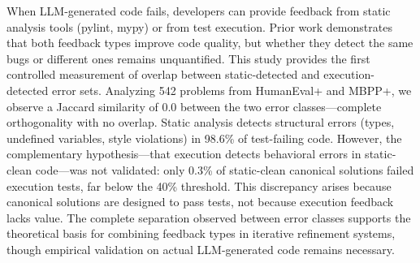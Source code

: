 
When LLM-generated code fails, developers can provide feedback from static analysis tools (pylint, mypy) or from test execution. Prior work demonstrates that both feedback types improve code quality, but whether they detect the same bugs or different ones remains unquantified. This study provides the first controlled measurement of overlap between static-detected and execution-detected error sets. Analyzing 542 problems from HumanEval+ and MBPP+, we observe a Jaccard similarity of 0.0 between the two error classes---complete orthogonality with no overlap. Static analysis detects structural errors (types, undefined variables, style violations) in 98.6\% of test-failing code. However, the complementary hypothesis---that execution detects behavioral errors in static-clean code---was not validated: only 0.3\% of static-clean canonical solutions failed execution tests, far below the 40\% threshold. This discrepancy arises because canonical solutions are designed to pass tests, not because execution feedback lacks value. The complete separation observed between error classes supports the theoretical basis for combining feedback types in iterative refinement systems, though empirical validation on actual LLM-generated code remains necessary.

